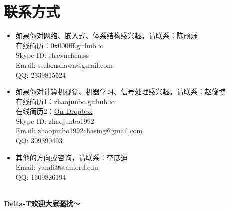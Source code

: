 \documentclass{article}
\begin{document}
\section{联系方式}
\begin{itemize}
\item{如果你对网络、嵌入式、体系结构感兴趣，请联系：陈硕烁\\
在线简历：0x000fff.github.io\\
Skype ID: shawnchen.ss\\
Email: sschenshawn@gmail.com\\
QQ: 2339815524}
\item{如果你对计算机视觉、机器学习、信号处理感兴趣，请联系：赵俊博\\
在线简历1：zhaojunbo.github.io\\
在线简历2：\href{https://www.dropbox.com/s/layknk0qbke541c/res9a_JunboZhao.pdf}{\textcolor{colorname}{On Dropbox}}\\
Skype ID: zhaojunbo1992\\
Email: zhaojunbo1992chasing@gmail.com\\
QQ: 309390493}
\item{其他的方向或咨询，请联系：李彦迪\\
Email: yandi@stanford.edu\\
QQ: 1609826194}
\end{itemize}
\\
\vspace{20pt}
{\large\bf Delta-T欢迎大家骚扰～}
\end{document}
